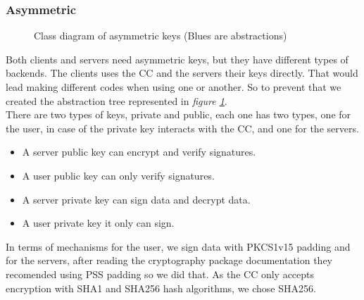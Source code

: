 \documentclass[12pt]{article}
\begin{document}
\subsubsection{Asymmetric}
\begin{figure}[h]
  \caption{Class diagram of asymmetric keys (Blues are abstractions)}
  \label{fig:asymmetric}
\end{figure}
Both clients and servers need asymmetric keys, but they have different types of
  backends. The clients uses the CC and the servers their keys directly.
  That would lead making different codes when using one or another. So to prevent that
  we created the abstraction tree  represented in \textit{figure \ref{fig:asymmetric}}. \\
There are two types of keys, private and public, each one has two types, one for the user, 
  in case of the private key interacts with the CC, and one for the servers. \\

  \begin{itemize}
  \item A server public key can encrypt and verify signatures. 
  \item A user public key can only verify signatures. 
  \item A server private key can sign data and decrypt data. 
  \item A user private key it only can sign. 
  \end{itemize} 

In terms of mechanisms for the user, we sign data with PKCS1v15 padding and for the servers, after reading
  the cryptography package documentation they recomended using PSS padding so we did that.
  As the CC only accepts encryption with SHA1 and SHA256 hash algorithms, we chose  SHA256.
\end{document}
